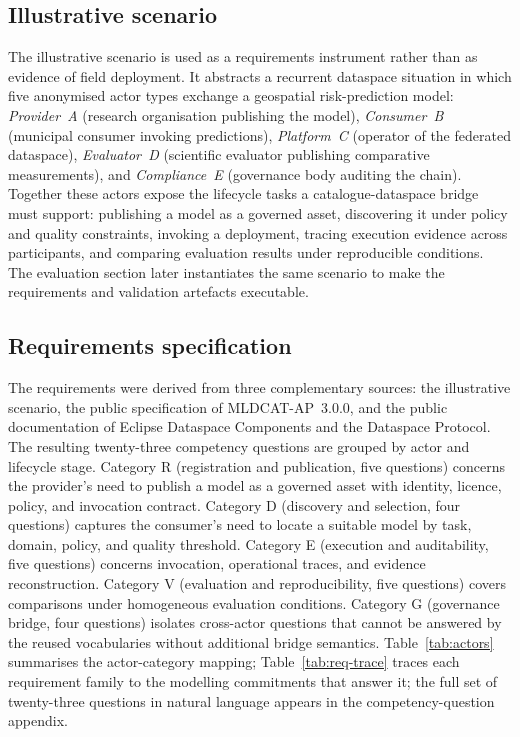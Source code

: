 \documentclass[Afour,sagev,times]{sagej}
\begin{document}
\subsection{Illustrative scenario}\label{sec:scenario}

The illustrative scenario is used as a requirements instrument rather than as evidence of field deployment. It abstracts a recurrent dataspace situation in which five anonymised actor types exchange a geospatial risk-prediction model: \emph{Provider~A} (research organisation publishing the model), \emph{Consumer~B} (municipal consumer invoking predictions), \emph{Platform~C} (operator of the federated dataspace), \emph{Evaluator~D} (scientific evaluator publishing comparative measurements), and \emph{Compliance~E} (governance body auditing the chain). Together these actors expose the lifecycle tasks a catalogue-dataspace bridge must support: publishing a model as a governed asset, discovering it under policy and quality constraints, invoking a deployment, tracing execution evidence across participants, and comparing evaluation results under reproducible conditions. The evaluation section later instantiates the same scenario to make the requirements and validation artefacts executable.

\subsection{Requirements specification}\label{sec:method-req}

The requirements were derived from three complementary sources: the illustrative scenario, the public specification of MLDCAT-AP~3.0.0, and the public documentation of Eclipse Dataspace Components and the Dataspace Protocol. The resulting twenty-three competency questions are grouped by actor and lifecycle stage. Category R (registration and publication, five questions) concerns the provider's need to publish a model as a governed asset with identity, licence, policy, and invocation contract. Category D (discovery and selection, four questions) captures the consumer's need to locate a suitable model by task, domain, policy, and quality threshold. Category E (execution and auditability, five questions) concerns invocation, operational traces, and evidence reconstruction. Category V (evaluation and reproducibility, five questions) covers comparisons under homogeneous evaluation conditions. Category G (governance bridge, four questions) isolates cross-actor questions that cannot be answered by the reused vocabularies without additional bridge semantics. Table~\ref{tab:actors} summarises the actor-category mapping; Table~\ref{tab:req-trace} traces each requirement family to the modelling commitments that answer it; the full set of twenty-three questions in natural language appears in the competency-question appendix.
\end{document}

